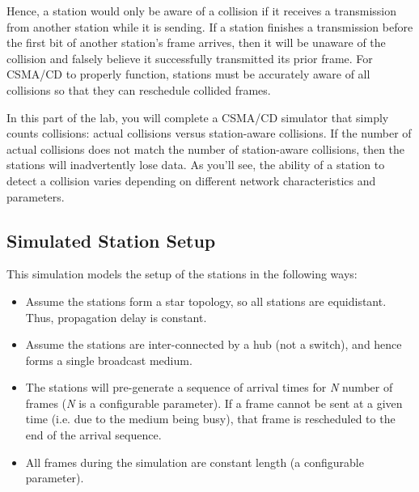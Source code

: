 \documentclass[11pt]{article}
\begin{document}
Hence, a station would only be aware of a collision if it receives a transmission from another station while it is sending.
If a station finishes a transmission before the first bit of another station's frame arrives, then it will be unaware of the collision and falsely believe it successfully transmitted its prior frame.
For CSMA/CD to properly function, stations must be accurately aware of all collisions so that they can reschedule collided frames.

In this part of the lab, you will complete a CSMA/CD simulator that simply counts collisions: actual collisions versus station-aware collisions.
If the number of actual collisions does not match the number of station-aware collisions, then the stations will inadvertently lose data.
As you'll see, the ability of a station to detect a collision varies depending on different network characteristics and parameters.


\subsection{Simulated Station Setup}
\label{subsec:station-setup}
This simulation models the setup of the stations in the following ways:
\begin{itemize}
    \item Assume the stations form a star topology, so all stations are equidistant. Thus, propagation delay is constant.
    \item Assume the stations are inter-connected by a hub (not a switch), and hence forms a single broadcast medium.
    \item The stations will pre-generate a sequence of arrival times for \textit{N} number of frames (\textit{N} is a configurable parameter). If a frame cannot be sent at a given time (i.e. due to the medium being busy), that frame is rescheduled to the end of the arrival sequence.
    \item All frames during the simulation are constant length (a configurable parameter).
\end{itemize}

\end{document}
